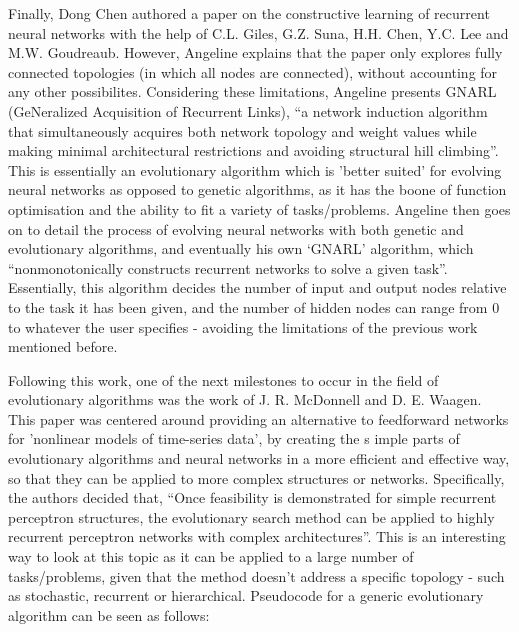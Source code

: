 \documentclass[12pt,a4paper]{article}
\begin{document}
\noindent
Finally, Dong Chen authored a paper on the constructive learning of recurrent neural networks with the help of C.L. Giles, G.Z. Suna, H.H. Chen, Y.C. Lee and M.W. Goudreaub\cite{6}. However, Angeline explains that the paper only explores fully connected topologies (in which all nodes are connected), without accounting for any other possibilites. Considering these limitations, Angeline presents GNARL (GeNeralized Acquisition of Recurrent Links),  “a network induction algorithm that simultaneously acquires both network topology and weight values while making minimal architectural restrictions and avoiding structural hill climbing”\cite[p.~2]{1}. This is essentially an evolutionary algorithm which is 'better suited' for evolving neural networks as opposed to genetic algorithms, as it has the boone of function optimisation and the ability to fit a variety of tasks/problems. Angeline then goes on to detail the process of evolving neural networks with both genetic and evolutionary algorithms, and eventually his own `GNARL' algorithm, which “nonmonotonically constructs recurrent networks to solve a given task”\cite[p.~2]{1}. Essentially, this algorithm decides the number of input and output nodes relative to the task it has been given, and the number of hidden nodes can range from 0 to whatever the user specifies - avoiding the limitations of the previous work mentioned before.

\noindent
Following this work, one of the next milestones to occur in the field of evolutionary algorithms was the work of J. R. McDonnell and D. E. Waagen. This paper\cite{22} was centered around providing an alternative to feedforward networks for 'nonlinear models of time-series data', by creating the s imple parts of evolutionary algorithms and neural networks in a more efficient and effective way, so that they can be applied to more complex structures or networks. Specifically, the authors decided that, “Once feasibility is demonstrated for simple recurrent perceptron structures, the evolutionary search method can be applied to highly recurrent perceptron networks with complex architectures”\cite[p.~1]{22}. This is an interesting way to look at this topic as it can be applied to a large number of tasks/problems, given that the method doesn't address a specific topology - such as stochastic, recurrent or hierarchical. Pseudocode for a generic evolutionary algorithm can be seen as follows: 
\end{document}
